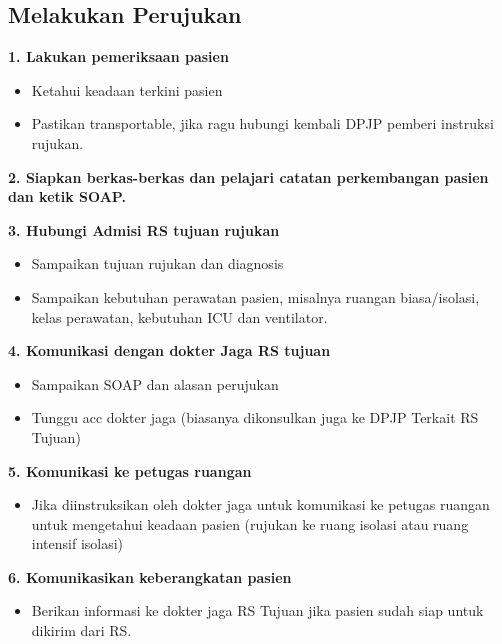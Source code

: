 \documentclass[
]{book}
\providecommand{\tightlist}{%
  \setlength{\itemsep}{0pt}\setlength{\parskip}{0pt}}
\begin{document}
\hypertarget{melakukan-perujukan}{%
\subsection{Melakukan Perujukan}\label{melakukan-perujukan}}

\textbf{1. Lakukan pemeriksaan pasien}

\begin{itemize}
\tightlist
\item
  Ketahui keadaan terkini pasien
\item
  Pastikan transportable, jika ragu hubungi kembali DPJP pemberi instruksi rujukan.
\end{itemize}

\textbf{2. Siapkan berkas-berkas dan pelajari catatan perkembangan pasien dan ketik SOAP.}

\textbf{3. Hubungi Admisi RS tujuan rujukan}

\begin{itemize}
\tightlist
\item
  Sampaikan tujuan rujukan dan diagnosis
\item
  Sampaikan kebutuhan perawatan pasien, misalnya ruangan biasa/isolasi, kelas perawatan, kebutuhan ICU dan ventilator.
\end{itemize}

\textbf{4. Komunikasi dengan dokter Jaga RS tujuan}

\begin{itemize}
\tightlist
\item
  Sampaikan SOAP dan alasan perujukan
\item
  Tunggu acc dokter jaga (biasanya dikonsulkan juga ke DPJP Terkait RS Tujuan)
\end{itemize}

\textbf{5. Komunikasi ke petugas ruangan}

\begin{itemize}
\tightlist
\item
  Jika diinstruksikan oleh dokter jaga untuk komunikasi ke petugas ruangan untuk mengetahui keadaan pasien (rujukan ke ruang isolasi atau ruang intensif isolasi)
\end{itemize}

\textbf{6. Komunikasikan keberangkatan pasien}

\begin{itemize}
\tightlist
\item
  Berikan informasi ke dokter jaga RS Tujuan jika pasien sudah siap untuk dikirim dari RS.
\end{itemize}
\end{document}
